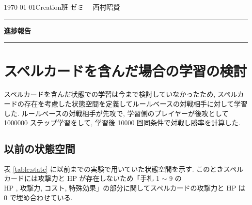 \documentclass{jarticle}     %
\begin{document}
  \noindent
  \hspace{1em}

  \today Creation班 ゼミ
  \hfill
  \ \  西村昭賢 

  \vspace{2mm}
  \hrule
  \begin{center}
  {\Large \bf 進捗報告}
  \end{center}
  \hrule 
  \vspace{3mm}


\section{スペルカードを含んだ場合の学習の検討}
スペルカードを含んだ状態での学習は今まで検討していなかったため, スペルカードの存在を考慮した状態空間を定義してルールベースの対戦相手に対して学習した.
ルールベースの対戦相手が先攻で, 学習側のプレイヤーが後攻として 1000000 ステップ学習をして, 学習後 10000 回同条件で対戦し勝率を計算した.

\subsection{以前の状態空間}
表 \ref{table:state} に以前までの実験で用いていた状態空間を示す. このときスペルカードには攻撃力と HP が存在しないため「手札 1 $\sim$ 9 の\\HP , 攻撃力, コスト, 特殊効果」の部分に関してスペルカードの攻撃力と HP は 0 で埋め合わせている.
\end{document}
